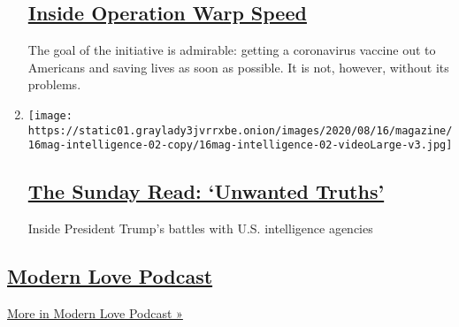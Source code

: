 \begin{enumerate}
  \hypertarget{inside-operation-warp-speed}{%
  \subsection{\texorpdfstring{\href{/2020/08/17/podcasts/the-daily/trump-coronavirus-vaccine-covid.html}{Inside
  Operation Warp
  Speed}}{Inside Operation Warp Speed}}\label{inside-operation-warp-speed}}

  The goal of the initiative is admirable: getting a coronavirus vaccine
  out to Americans and saving lives as soon as possible. It is not,
  however, without its problems.
\item
  \texttt{[image: https://static01.graylady3jvrrxbe.onion/images/2020/08/16/magazine/16mag-intelligence-02-copy/16mag-intelligence-02-videoLarge-v3.jpg]}

  \hypertarget{the-sunday-read-unwanted-truths}{%
  \subsection{\texorpdfstring{\href{/2020/08/16/podcasts/the-daily/trump-russia-intelligence.html}{The
  Sunday Read: `Unwanted
  Truths'}}{The Sunday Read: `Unwanted Truths'}}\label{the-sunday-read-unwanted-truths}}

  Inside President Trump's battles with U.S. intelligence agencies
\end{enumerate}

\hypertarget{modern-love-podcast-1}{%
\subsection{\texorpdfstring{\href{/column/modern-love-podcast}{Modern
Love Podcast}}{Modern Love Podcast}}\label{modern-love-podcast-1}}

\href{/column/modern-love-podcast}{More in Modern Love Podcast »}

